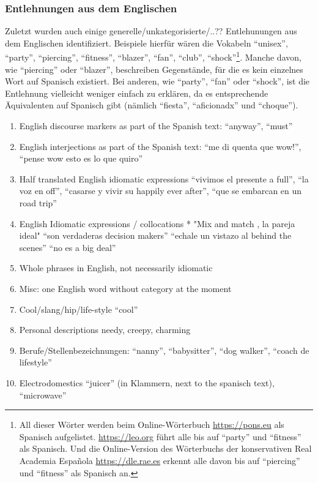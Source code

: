 \subsubsection{Entlehnungen aus dem Englischen}
Zuletzt wurden auch einige generelle/unkategorisierte/..?? Entlehunungen aus dem Englischen identifiziert.
Beispiele hierfür wären die Vokabeln ``unisex'', ``party'', ``piercing'', ``fitness'', ``blazer'', ``fan'', ``club'', ``shock''\footnote{All dieser Wörter werden beim Online-Wörterbuch \url{https://pons.eu} als Spanisch aufgelistet. \url{https://leo.org} führt alle bis auf ``party'' und ``fitness'' als Spanisch. Und die Online-Version des Wörterbuchs der konservativen Real Academia Española \url{https://dle.rae.es} erkennt alle davon bis auf ``piercing'' und ``fitness'' als Spanisch an.}.
Manche davon, wie ``piercing'' oder ``blazer'', beschreiben Gegenstände, für die es kein einzelnes Wort auf Spanisch existiert.
Bei anderen, wie ``party'', ``fan'' oder ``shock'',  ist die Entlehnung vielleicht weniger einfach zu erklären, da es entsprechende Äquivalenten auf Spanisch gibt (nämlich ``fiesta'', ``aficionadx'' und ``choque''). %

\begin{enumerate}
  \item English discourse markers as part of the Spanish text:
      ``anyway'', ``must''
  \item English interjections as part of the Spanish text:
      ``me di quenta que wow!'', ``pense wow esto es lo que quiro''
  \item Half translated English idiomatic expressions
      ``vivimos el presente a full'', ``la voz en off'', ``casarse y vivir su happily ever after'', ``que se embarcan en un road trip''
  \item English Idiomatic expressions / collocations
    * "Mix and match , la pareja ideal"
        ``son verdaderas decision makers''
        ``echale un vistazo al behind the scenes''
        ``no es a big deal''
  \item Whole phrases in English, not necessarily idiomatic %


  \item Misc: one English word without category at the moment
  \item Cool/slang/hip/life-style
      ``cool''
  \item Personal descriptions
      needy, creepy, charming
  \item Berufe/Stellenbezeichnungen: ``nanny'', ``babysitter'', ``dog walker'', ``coach de lifestyle''
  \item Electrodomestics
      ``juicer'' (in Klammern, next to the spanisch text), ``microwave''
\end{enumerate}

